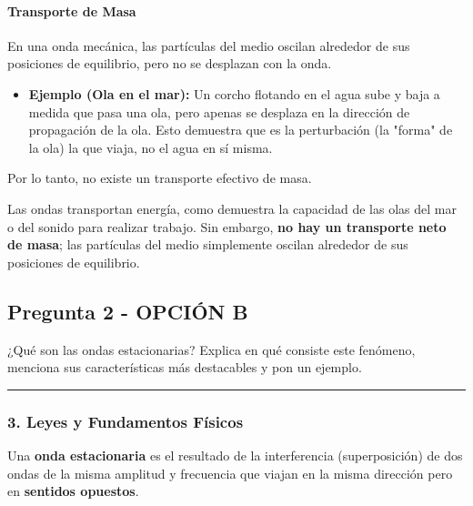 \paragraph*{Transporte de Masa}
En una onda mecánica, las partículas del medio oscilan alrededor de sus posiciones de equilibrio, pero no se desplazan con la onda.
\begin{itemize}
    \item \textbf{Ejemplo (Ola en el mar):} Un corcho flotando en el agua sube y baja a medida que pasa una ola, pero apenas se desplaza en la dirección de propagación de la ola. Esto demuestra que es la perturbación (la "forma" de la ola) la que viaja, no el agua en sí misma.
\end{itemize}
Por lo tanto, no existe un transporte efectivo de masa.

\begin{cajaresultado}
Las ondas transportan energía, como demuestra la capacidad de las olas del mar o del sonido para realizar trabajo. Sin embargo, \textbf{no hay un transporte neto de masa}; las partículas del medio simplemente oscilan alrededor de sus posiciones de equilibrio.
\end{cajaresultado}

\newpage

\subsection{Pregunta 2 - OPCIÓN B}
\label{subsec:2B_2004_jun_ord}

\begin{cajaenunciado}
¿Qué son las ondas estacionarias? Explica en qué consiste este fenómeno, menciona sus características más destacables y pon un ejemplo.
\end{cajaenunciado}
\hrule

\subsubsection*{3. Leyes y Fundamentos Físicos}
Una \textbf{onda estacionaria} es el resultado de la interferencia (superposición) de dos ondas de la misma amplitud y frecuencia que viajan en la misma dirección pero en \textbf{sentidos opuestos}.
